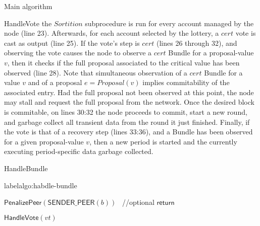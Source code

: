 \documentclass[10pt,a4paper]{article}
\begin{document}
\begin{section}{Main algorithm}
\begin{subsection}{HandleVote}
the $Sortition$ subprocedure is run for every account managed by the node (line 23). Afterwards, for each account selected by
the lottery, a $cert$ vote is cast as output (line 25).
If the vote's step is $cert$ (lines 26 through 32), and observing the vote causes the node to observe a $cert$ Bundle for a proposal-value $v$,
then it checks if the full proposal associated to the critical value has been observed (line 28). Note that simultaneous observation of a $cert$ Bundle 
for a value $v$ and of a proposal $e = Proposal(v)$ implies commitability of the associated entry.
Had the full proposal not been observed at this point, the node may stall and request the full proposal from the network.
Once the desired block is commitable, on lines 30:32 the node proceeds to commit, start a new round, and garbage collect all
transient data from the round it just finished.
Finally, if the vote is that of a recovery step (lines 33:36), and a Bundle has been observed for a given proposal-value $v$,
then a new period is started and the currently executing period-specific data garbage collected.



\end{subsection}


\begin{subsection}{HandleBundle}\label{ssect:HandleBundle}

    \begin{algorithm}[H]
        \caption{\underline{HandleBundle}}
        label{algo:habdle-bundle}
        \begin{algorithmic}[1]



                \State $\mathsf{PenalizePeer}(\mathsf{SENDER\_PEER}(b))$ \ //optional
                \State $\mathsf{return}$
            \EndIf

                    \State $\mathsf{HandleVote}(vt)$
                \EndFor
            \EndIf


\end{algorithmic}
\end{algorithm}
\end{subsection}
\end{section}
\end{document}
